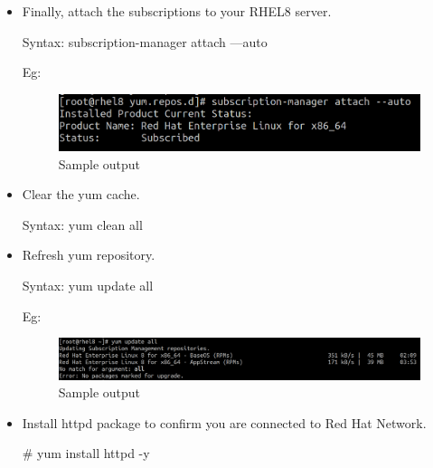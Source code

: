 \begin{flushleft}
\begin{itemize}
			\newpage
			\item Finally, attach the subscriptions to your RHEL8 server.
			\begin{tcolorbox}[breakable,notitle,boxrule=-0pt,colback=pink,colframe=pink]
				\color{black}
				\font=9pt
				Syntax: subscription-manager attach ---auto
				\font=4pt
			\end{tcolorbox}
			Eg:
			\begin{figure}[h!]
				\centering
				\includegraphics[scale=.3]{content/chapter11/images/4.png}
				\caption{Sample output}
				\label{fig:iso7}
			\end{figure}		
			\bigskip
						\bigskip
			\item Clear the yum cache.
			\begin{tcolorbox}[breakable,notitle,boxrule=-0pt,colback=pink,colframe=pink]
				\color{black}
				\font=9pt
				Syntax: yum clean all
				\font=4pt
			\end{tcolorbox}		
			\bigskip
						\bigskip
			\item Refresh yum repository.
			\begin{tcolorbox}[breakable,notitle,boxrule=-0pt,colback=pink,colframe=pink]
				\color{black}
				\font=9pt
				Syntax: yum update all
				\font=4pt
			\end{tcolorbox}		
			Eg:
			\begin{figure}[h!]
				\centering
				\includegraphics[scale=.25]{content/chapter11/images/update.png}
				\caption{Sample output}
				\label{fig:iso7}
			\end{figure}		
			\bigskip
			\bigskip
			\item Install httpd package to confirm you are connected to Red Hat Network.
			\bigskip
			\begin{tcolorbox}[breakable,notitle,boxrule=-0pt,colback=black,colframe=black]
				\color{white}
				\font=9pt
				\color{green}
				\# yum install httpd -y
				\font=4pt
			\end{tcolorbox}
\end{itemize}
	
		
		
	
	
\end{flushleft}

\newpage

